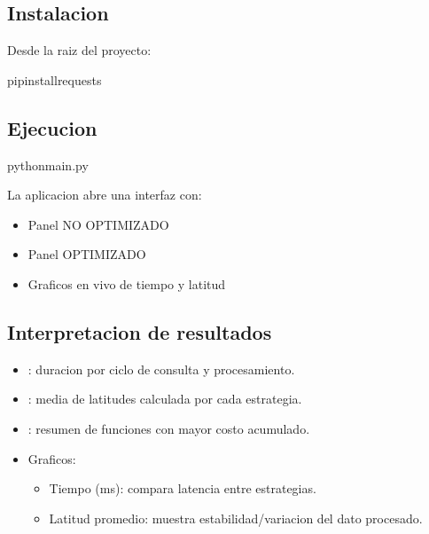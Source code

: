 \documentclass[letterpaper,10pt,spanish]{sphinxmanual}
\begin{document}
\subsection{Instalacion}
\label{\detokenize{uso:instalacion}}
\sphinxAtStartPar
Desde la raiz del proyecto:

\begin{sphinxVerbatim}[commandchars=\\\{\}]
pipinstallrequests
\end{sphinxVerbatim}


\subsection{Ejecucion}
\label{\detokenize{uso:ejecucion}}
\begin{sphinxVerbatim}[commandchars=\\\{\}]
pythonmain.py
\end{sphinxVerbatim}

\sphinxAtStartPar
La aplicacion abre una interfaz con:
\begin{itemize}
\item {} 
\sphinxAtStartPar
Panel NO OPTIMIZADO

\item {} 
\sphinxAtStartPar
Panel OPTIMIZADO

\item {} 
\sphinxAtStartPar
Graficos en vivo de tiempo y latitud

\end{itemize}


\subsection{Interpretacion de resultados}
\label{\detokenize{uso:interpretacion-de-resultados}}\begin{itemize}
\item {} 
\sphinxAtStartPar
{}: duracion por ciclo de consulta y procesamiento.

\item {} 
\sphinxAtStartPar
{}: media de latitudes calculada por cada estrategia.

\item {} 
\sphinxAtStartPar
{}: resumen de funciones con mayor costo acumulado.

\item {} 
\sphinxAtStartPar
Graficos:
\begin{itemize}
\item {} 
\sphinxAtStartPar
Tiempo (ms): compara latencia entre estrategias.

\item {} 
\sphinxAtStartPar
Latitud promedio: muestra estabilidad/variacion del dato procesado.

\end{itemize}

\end{itemize}
\end{document}

